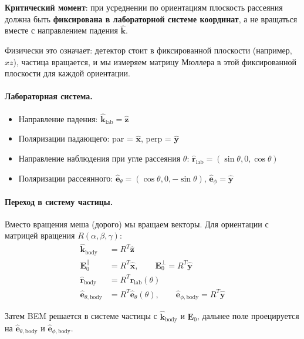 \documentclass[12pt,a4paper]{article}
\begin{document}
\textbf{Критический момент}: при усреднении по ориентациям плоскость рассеяния должна быть \textbf{фиксирована в лабораторной системе координат}, а не вращаться вместе с направлением падения $\hat{\mathbf{k}}$.

Физически это означает: детектор стоит в фиксированной плоскости (например, $xz$), частица вращается, и мы измеряем матрицу Мюллера в этой фиксированной плоскости для каждой ориентации.

\paragraph{Лабораторная система.}
\begin{itemize}
  \item Направление падения: $\hat{\mathbf{k}}_{\mathrm{lab}} = \hat{\mathbf{z}}$
  \item Поляризации падающего: par = $\hat{\mathbf{x}}$, perp = $\hat{\mathbf{y}}$
  \item Направление наблюдения при угле рассеяния $\theta$: $\hat{\mathbf{r}}_{\mathrm{lab}} = (\sin\theta, 0, \cos\theta)$
  \item Поляризации рассеянного: $\hat{\mathbf{e}}_\theta = (\cos\theta, 0, -\sin\theta)$, $\hat{\mathbf{e}}_\phi = \hat{\mathbf{y}}$
\end{itemize}

\paragraph{Переход в систему частицы.}
Вместо вращения меша (дорого) мы вращаем векторы. Для ориентации с матрицей вращения $R(\alpha,\beta,\gamma)$:
\begin{align}
  \hat{\mathbf{k}}_{\mathrm{body}} &= R^T \hat{\mathbf{z}} \\
  \mathbf{E}_0^{\parallel} &= R^T \hat{\mathbf{x}}, \qquad \mathbf{E}_0^{\perp} = R^T \hat{\mathbf{y}} \\
  \hat{\mathbf{r}}_{\mathrm{body}} &= R^T \hat{\mathbf{r}}_{\mathrm{lab}}(\theta) \\
  \hat{\mathbf{e}}_{\theta,\mathrm{body}} &= R^T \hat{\mathbf{e}}_\theta(\theta), \qquad \hat{\mathbf{e}}_{\phi,\mathrm{body}} = R^T \hat{\mathbf{y}}
\end{align}

Затем BEM решается в системе частицы с $\hat{\mathbf{k}}_{\mathrm{body}}$ и $\mathbf{E}_0$, дальнее поле проецируется на $\hat{\mathbf{e}}_{\theta,\mathrm{body}}$ и $\hat{\mathbf{e}}_{\phi,\mathrm{body}}$.
\end{document}
